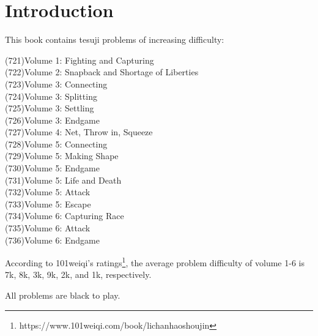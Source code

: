 \chapter*{Introduction}%
\thispagestyle{empty}%
This book contains \countproblems{} tesuji problems of increasing difficulty:

(721)\:\:Volume 1: Fighting and Capturing\\
(722)\:\:Volume 2: Snapback and Shortage of Liberties\\
(723)\:\:Volume 3: Connecting\\
(724)\:\:Volume 3: Splitting\\
(725)\:\:Volume 3: Settling\\
(726)\:\:Volume 3: Endgame\\
(727)\:\:Volume 4: Net, Throw in, Squeeze\\
(728)\:\:Volume 5: Connecting\\
(729)\:\:Volume 5: Making Shape\\
(730)\:\:Volume 5: Endgame\\
(731)\:\:Volume 5: Life and Death\\
(732)\:\:Volume 5: Attack\\
(733)\:\:Volume 5: Escape\\
(734)\:\:Volume 6: Capturing Race\\
(735)\:\:Volume 6: Attack\\
(736)\:\:Volume 6: Endgame

According to 101weiqi's ratings\footnote{https://www.101weiqi.com/book/lichanhaoshoujin}, the average problem difficulty of volume 1-6 is 7k, 8k, 3k, 9k, 2k, and 1k, respectively.

All problems are black to play.

\renderproblems
\rendersolutions


